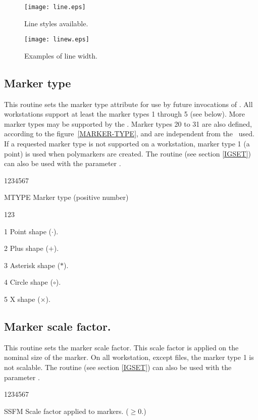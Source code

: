 \begin{figure}[p]
\begin{center}\texttt{[image: line.eps]}\end{center}
\caption{Line styles available.}
\label{LINE-TYPE}

\bigskip

\begin{center}\texttt{[image: linew.eps]}\end{center}
\caption{Examples of line width.}
\label{LINE-WIDTH}
\end{figure}
\clearpage
%
\subsection{Marker type}
\Action
This routine sets the marker type attribute for use by future invocations of
. All workstations support at least the marker types 1 through 5
(see below). More marker types may be supported by the \UGP. Marker types 20 to
31 are also defined, according to the figure~\ref{MARKER-TYPE}, and are
independent from the \UGP~used. If a requested marker type is not supported on a
workstation, marker type 1 (a point) is used when polymarkers are created.
The routine  (see section \ref{IGSET}) can also be used with the
parameter .
\Pdesc
\begin{DLtt}{1234567}
\item[MTYPE] Marker type (positive number)
\begin{DLtt}{123}
\item[1] Point shape ($\cdot$).
\item[2] Plus shape ($+$).
\item[3] Asterisk shape ($\ast$).
\item[4] Circle shape ($\circ$).
\item[5] X shape ($\times$).
\end{DLtt}
\end{DLtt}
%
\subsection{Marker scale factor.}
\Action
This routine sets the marker scale factor. This scale factor is applied on
the nominal size of the marker. On all workstation, except \PS{} files, the marker
type 1 is not scalable. The routine  (see section \ref{IGSET}) can
also be used with the parameter .
\Pdesc
\begin{DLtt}{1234567}
\item[SSFM] Scale factor applied to markers. (\(\geq0.\))
\end{DLtt}

